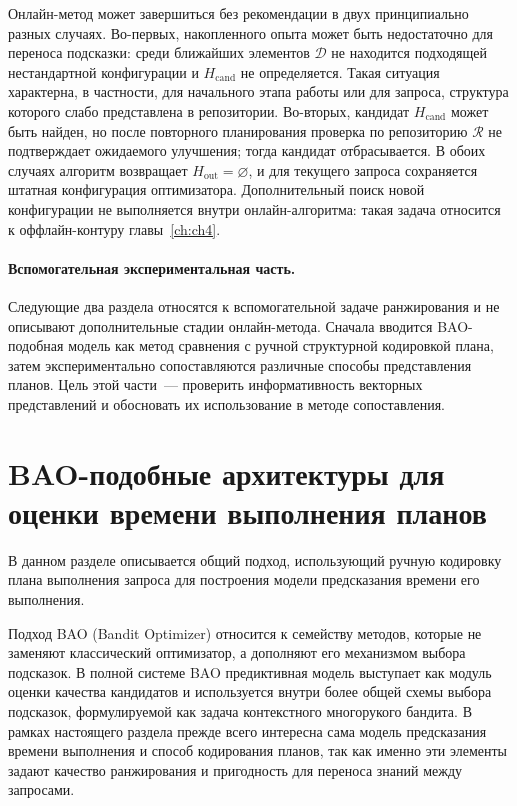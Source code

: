 Онлайн-метод может завершиться без рекомендации в двух принципиально разных случаях. Во-первых, накопленного опыта может быть недостаточно для переноса подсказки: среди ближайших элементов $\mathcal{D}$ не находится подходящей нестандартной конфигурации и $H_{\mathrm{cand}}$ не определяется. Такая ситуация характерна, в частности, для начального этапа работы или для запроса, структура которого слабо представлена в репозитории. Во-вторых, кандидат $H_{\mathrm{cand}}$ может быть найден, но после повторного планирования проверка по репозиторию $\mathcal{R}$ не подтверждает ожидаемого улучшения; тогда кандидат отбрасывается. В обоих случаях алгоритм возвращает $H_{\mathrm{out}}=\varnothing$, и для текущего запроса сохраняется штатная конфигурация оптимизатора. Дополнительный поиск новой конфигурации не выполняется внутри онлайн-алгоритма: такая задача относится к оффлайн-контуру главы~\ref{ch:ch4}.

\paragraph{Вспомогательная экспериментальная часть.}
Следующие два раздела относятся к вспомогательной задаче ранжирования и не описывают дополнительные стадии онлайн-метода. Сначала вводится BAO-подобная модель как метод сравнения с ручной структурной кодировкой плана, затем экспериментально сопоставляются различные способы представления планов. Цель этой части~--- проверить информативность векторных представлений и обосновать их использование в методе сопоставления.


\section{BAO-подобные архитектуры для оценки времени выполнения планов}\label{sec:ch3/sec4}
В данном разделе описывается общий подход, использующий ручную кодировку плана выполнения запроса для построения модели предсказания времени его выполнения.

Подход BAO (Bandit Optimizer) относится к семейству методов, которые не заменяют классический оптимизатор, а дополняют его механизмом выбора подсказок. В полной системе BAO предиктивная модель выступает как модуль оценки качества кандидатов и используется внутри более общей схемы выбора подсказок, формулируемой как задача контекстного многорукого бандита. В рамках настоящего раздела прежде всего интересна сама модель предсказания времени выполнения и способ кодирования планов, так как именно эти элементы задают качество ранжирования и пригодность для переноса знаний между запросами.

